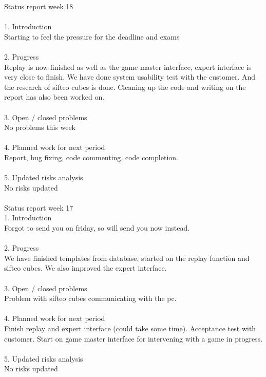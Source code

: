 Status report week 18\\
\\
1. Introduction\\
Starting to feel the pressure for the deadline and exams\\
\\
2. Progress\\
Replay is now finished as well as the game master interface, expert interface is very close to finish. We have done system usability test with the customer. And the research of sifteo cubes is done. Cleaning up the code and writing on the report has also been worked on.\\
\\
3. Open / closed problems\\
No problems this week\\
\\
4. Planned work for next period\\
Report, bug fixing, code commenting, code completion.\\
\\
5. Updated risks analysis\\
No risks updated\\
\\
Status report week 17\\

1. Introduction\\
Forgot to send you on friday, so will send you now instead.\\
\\
2. Progress\\
We have finished templates from database, started on the replay function and sifteo cubes. We also improved the expert interface.\\
\\
3. Open / closed problems\\
Problem with sifteo cubes communicating with the pc.\\
\\
4. Planned work for next period\\
Finish replay and expert interface (could take some time). Acceptance test with customer. Start on game master interface for intervening with a game in progress.\\
\\
5. Updated risks analysis\\
No risks updated\\

